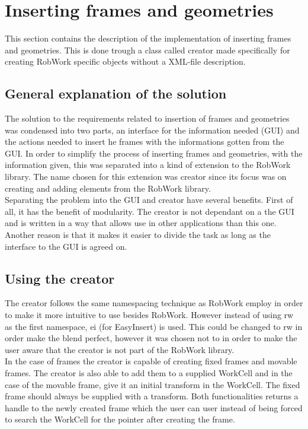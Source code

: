 \section{Inserting frames and geometries}
\label{sec:iframAGeom}
This section contains the description of the implementation of inserting frames and geometries. This is done trough a class called creator made specifically for creating RobWork specific objects without a XML-file description.

\subsection{General explanation of the solution}
\label{subsec:iFramesAGeomsGE}
The solution to the requirements related to insertion of frames and geometries was condensed into two parts, an interface for the information needed (GUI) and the actions needed to insert he frames with the informations gotten from the GUI. In order to simplify the process of inserting frames and geometries, with the information given, this was separated into a kind of extension to the RobWork library. The name chosen for this extension was creator since its focus was on creating and adding elements from the RobWork library.\\

Separating the problem into the GUI and creator have several benefits. First of all, it has the benefit of modularity. The creator is not dependant on a the GUI and is written in a way that allows use in other applications than this one.\\
Another reason is that it makes it easier to divide the task as long as the interface to the GUI is agreed on.

\subsection{Using the creator}
\label{subsec:iframAGeomUsing}
The creator follows the same namespacing technique as RobWork employ in order to make it more intuitive to use besides RobWork. However instead of using rw as the first namespace, ei (for EasyInsert) is used. This could be changed to rw in order make the blend perfect, however it was chosen not to in order to make the user aware that the creator is not part of the RobWork library.\\

In the case of frames the creator is capable of creating fixed frames and movable frames. The creator is also able to add them to a supplied WorkCell and in the case of the movable frame, give it an initial transform in the WorkCell. The fixed frame should always be supplied with a transform. 
Both functionalities returns a handle to the newly created frame which the user can user instead of being forced to search the WorkCell for the pointer after creating the frame.\\

